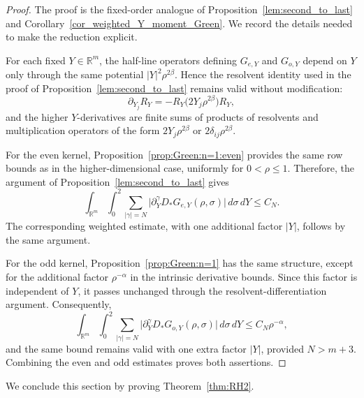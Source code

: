 \documentclass[12pt]{amsart}
\begin{document}
\begin{proof}
The proof is the fixed-order analogue of Proposition~\ref{lem:second_to_last}
and Corollary~\ref{cor_weighted_Y_moment_Green}. We record the details needed to make the
reduction explicit.

For each fixed $Y\in\mathbb R^m$, the half-line operators defining
$G_{e,Y}$ and $G_{o,Y}$ depend on $Y$ only through the same potential
$|Y|^2\rho^{2\beta}$. Hence the resolvent identity used in the proof of
Proposition~\ref{lem:second_to_last} remains valid without modification:
\begin{equation*}
    \partial_{Y_j}R_Y = -R_Y\bigl(2Y_j\rho^{2\beta}\bigr)R_Y,
\end{equation*}
and the higher $Y$-derivatives are finite sums of products of resolvents and
multiplication operators of the form $2Y_j\rho^{2\beta}$ or $2\delta_{ij}\rho^{2\beta}$.

For the even kernel, Proposition~\ref{prop:Green:n=1:even} provides the same row bounds as in the higher-dimensional case, uniformly for $0<\rho\leq1$. Therefore, the argument of Proposition~\ref{lem:second_to_last} gives
\begin{equation*}
    \int_{\mathbb R^m}\int_0^2
\sum_{|\gamma|=N}\bigl|\partial_Y^\gamma D_*G_{e,Y}(\rho,\sigma)\bigr|
\, d\sigma \, dY
\leq C_N.
\end{equation*}
The corresponding weighted estimate, with one additional factor $|Y|$, follows by the same argument.

For the odd kernel, Proposition~\ref{prop:Green:n=1} has the same structure, except for the additional factor $\rho^{-\alpha}$ in the intrinsic derivative bounds. Since this factor is independent of $Y$, it passes unchanged through the
resolvent-differentiation argument. Consequently,
\begin{equation*}
    \int_{\mathbb R^m}\int_0^2
\sum_{|\gamma|=N}\bigl|\partial_Y^\gamma D_*G_{o,Y}(\rho,\sigma)\bigr|
\, d\sigma \, dY
\leq C_N\rho^{-\alpha},
\end{equation*}
and the same bound remains valid with one extra factor $|Y|$, provided
$N>m+3$. Combining the even and odd estimates proves both assertions.
\end{proof}

We conclude this section by proving Theorem~\ref{thm:RH2}.
\end{document}
